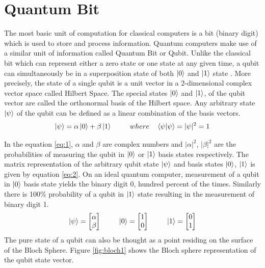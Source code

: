 \documentclass[english,a4paper,11pt,oneside,onecolumn]{book}
\begin{document}
\section{Quantum Bit}
\label{sec:qubit}

The most basic unit of computation for classical computers is a bit (binary digit) which is used to store and process information. Quantum computers make use of a similar unit of information called Quantum Bit or Qubit. Unlike the classical bit which can represent either a zero state or one state at any given time, a qubit can simultaneously be in a superposition state of both $\ket{0}$ and $\ket{1}$ state \cite{nielsen_2019_quantum}. More precisely, the state of a single qubit is a unit vector in a 2-dimensional complex vector space called Hilbert Space. The special states $\ket{0}$ and $\ket{1}$, of the qubit vector are called the orthonormal basis of the Hilbert space. Any arbitrary state \(\ket{\psi}\) of the qubit can be defined as a linear combination of the basis vectors.
\begin{equation}\label{eq:1}
    \ket{\psi} = \alpha\ket{0} + \beta\ket{1} \hspace{25pt}where\hspace{10pt} \braket{\psi|\psi} = |\psi|^2 = 1
\end{equation}

In the equation \ref{eq:1}, \(\alpha\) and \(\beta\) are complex numbers and \(|\alpha|^2\), \(|\beta|^2\) are the probabilities of measuring the qubit in $\ket{0}$ or $\ket{1}$ basis states respectively. The matrix representation of the arbitrary qubit state \(\ket{\psi}\) and basis states \(\ket{0}\), \(\ket{1}\) is given by equation \ref{eq:2}. On an ideal quantum computer, measurement of a qubit in $\ket{0}$ basis state yields the binary digit 0, hundred percent of the times. Similarly there is 100\% probability of a qubit in $\ket{1}$ state resulting in the measurement of binary digit 1. 
\begin{equation}\label{eq:2}
\ket{\psi} = 
\begin{bmatrix}
\alpha\\
\beta
\end{bmatrix}\hspace{25pt}
\ket{0} = 
\begin{bmatrix}
1\\
0
\end{bmatrix}\hspace{25pt}
\ket{1} = 
\begin{bmatrix}
0\\
1
\end{bmatrix}
\end{equation}
The pure state of a qubit can also be thought as a point residing on the surface of the Bloch Sphere. Figure \ref{fig:bloch1} shows the Bloch sphere representation of the qubit state vector.
\end{document}
